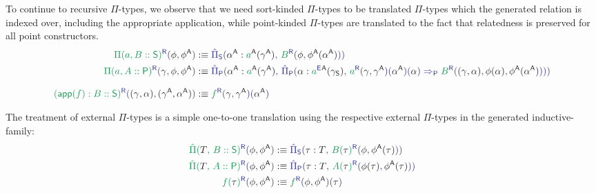 \begin{defn}
To continue to recursive $\Pi$-types, we observe that we need sort-kinded
$\Pi$-types to be translated $\Pi$-types which the generated relation is
indexed over, including the appropriate application,
while point-kinded $\Pi$-types are translated to the fact that
relatedness is preserved for all point constructors.
\begin{align*}
\tqm{\grm{\Pi(a, B :: \Sc)}^\RR(\blphi, \blphiCC)}
  &:\equiv \tqm{\ExtPiS{\blalphaCC : \grm{a}^\CC(\blgammaCC)}
    {\grm{B}^\RR(\blphi, \blm{\blphiCC(\blalphaCC)})}} \\
\tqm{\grm{\Pi(a, A :: \Pc)}^\RR(\blgamma, \blphi, \blphiCC)}
  &:\equiv \tqm{\ExtPiP{\blalphaCC : \grm{a}^\CC(\blgammaCC)}
    {\ExtPiP{\blalpha : \tqm{\grm{a}^\EE}^\CC(\gamma_\Sc)}
    {\grm{a}^\RR(\blgamma,\blgammaCC)(\blalphaCC)(\blalpha)
    \Rightarrow_\Pc \grm{B}^\RR(\blm{(\gamma, \alpha)}, \blm{\phi(\alpha)}, \blm{\blphiCC(\blalphaCC)}) }}  } \\[.7em]
\tqm{\grm{(\IIapp(f) : B :: \Sc)}^\RR(\blm{(\gamma, \alpha)},\blm{(\blgammaCC,\blalphaCC)})}
  &:\equiv \tqm{\grm{f}^\RR(\blgamma, \blgammaCC)(\blalphaCC) }
\end{align*}

The treatment of external $\Pi$-types is a simple one-to-one translation
using the respective external $\Pi$-types in the generated inductive-family:
\begin{align*}
\tqm{\grm{\ExtPi{T}{B :: \Sc}}^\RR(\blphi, \blphiCC)}
  &:\equiv \tqm{\ExtPiS{\tau : T}{\grm{B(\bltau)}^\RR(\blphi, \blm{\phi^\CC(\tau)})}} \\
\tqm{\grm{\ExtPi{T}{A :: \Pc}}^\RR(\blphi, \blphiCC)}
  &:\equiv \tqm{\ExtPiP{\tau : T}{\grm{A(\bltau)}^\RR(\blm{\phi(\tau)}, \blm{\phi^\CC(\tau)})}} \\
\tqm{\grm{f(\bltau)}^\RR(\blphi, \blphiCC)}
  &:\equiv \tqm{\grm{f}^\RR(\blphi, \blphiCC)(\bltau)}
\end{align*}


\end{defn}





















